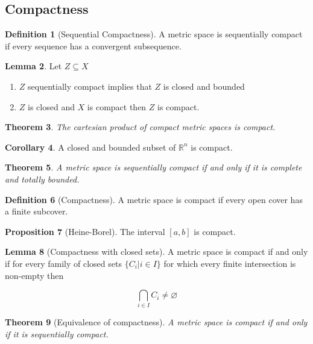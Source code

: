 \documentclass[11pt,a4paper, titlepage]{article}
\newtheorem{theorem}{Theorem}[section]
\theoremstyle{definition}
\newtheorem{definition}[theorem]{Definition}
\newtheorem{corollary}[theorem]{Corollary}
\newtheorem{lemma}[theorem]{Lemma}
\newtheorem{proposition}[theorem]{Proposition}
\begin{document}
\subsection{Compactness}

\begin{definition}[Sequential Compactness]
A metric space is sequentially compact if every sequence has a convergent subsequence.
\end{definition}

\begin{lemma}
Let $Z \subseteq X$
\begin{enumerate}
	\item $Z$ sequentially compact implies that $Z$ is closed and bounded
	\item $Z$ is closed and $X$ is compact then $Z$ is compact.
\end{enumerate}
\end{lemma}

\begin{theorem}
The cartesian product of compact metric spaces is compact.
\end{theorem}

\begin{corollary}
A closed and bounded subset of $\mathbb{R}^n$ is compact.
\end{corollary}

\begin{theorem}
A metric space is sequentially compact if and only if it is complete and totally bounded.
\end{theorem}

\begin{definition}[Compactness]
A metric space is compact if every open cover has a finite subcover.
\end{definition}

\begin{proposition}[Heine-Borel]
The interval $[a,b]$ is compact.
\end{proposition}

\begin{lemma}[Compactness with closed sets]

A metric space is compact if and only if for every family of closed sets $\{C_i | i \in I\}$ for which every finite intersection is non-empty then 

\[
	\bigcap_{i \in I} C_i \neq \varnothing
\]
\end{lemma}

\begin{theorem}[Equivalence of compactness]
A metric space is compact if and only if it is sequentially compact.
\end{theorem}
\end{document}

